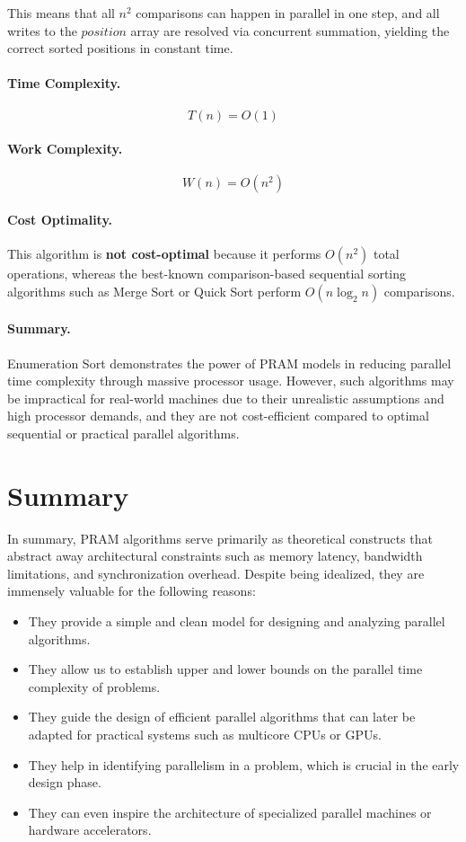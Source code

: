 \documentclass[12pt]{book}
\begin{document}
This means that all $n^2$ comparisons can happen in parallel in one step, and all writes to the $position$ array are resolved via concurrent summation, yielding the correct sorted positions in constant time.

\paragraph{Time Complexity.}  
\[
T(n) = O(1)
\]

\paragraph{Work Complexity.}  
\[
W(n) = O(n^2)
\]

\paragraph{Cost Optimality.}  
This algorithm is \textbf{not cost-optimal} because it performs $O(n^2)$ total operations, whereas the best-known comparison-based sequential sorting algorithms such as Merge Sort or Quick Sort perform $O(n \log_2 n)$ comparisons.

\paragraph{Summary.}  
Enumeration Sort demonstrates the power of PRAM models in reducing parallel time complexity through massive processor usage. However, such algorithms may be impractical for real-world machines due to their unrealistic assumptions and high processor demands, and they are not cost-efficient compared to optimal sequential or practical parallel algorithms.

\section{Summary}

In summary, PRAM algorithms serve primarily as theoretical constructs that abstract away architectural constraints such as memory latency, bandwidth limitations, and synchronization overhead. Despite being idealized, they are immensely valuable for the following reasons:

\begin{itemize}
    \item They provide a simple and clean model for designing and analyzing parallel algorithms.
    \item They allow us to establish upper and lower bounds on the parallel time complexity of problems.
    \item They guide the design of efficient parallel algorithms that can later be adapted for practical systems such as multicore CPUs or GPUs.
    \item They help in identifying parallelism in a problem, which is crucial in the early design phase.
    \item They can even inspire the architecture of specialized parallel machines or hardware accelerators.
\end{itemize}
\end{document}
